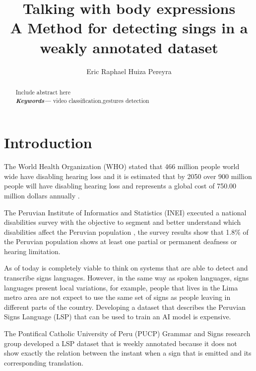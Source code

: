 \documentclass[twocolumn]{article}
\providecommand{\keywords}[1]
{
  \small	
  \textbf{\textit{Keywords---}} #1
}
\begin{document}
\author[1]{Eric Raphael Huiza Pereyra}

\title{%
	\vspace{-2.0cm}
	\textbf{Talking with body expressions} \\	
	\Large \textbf{A Method for detecting sings in a weakly annotated dataset}
}

\maketitle
    
\begin{abstract}
Include abstract here \\
\keywords{video classification,gestures detection}
\end{abstract}

\section{Introduction}\label{intro}

The World Health Organization (WHO) stated that 466 million people world wide have disabling hearing loss and it is estimated that by 2050 over 900 million people will have disabling hearing loss and represents a global cost of 750.00 million dollars annually \cite{deafness_and_hearing_loss_2019}. 

The Peruvian Institute of Informatics and Statistics (INEI) executed a national disabilities survey with the objective to segment and better understand which disabilities affect the Peruvian population \cite{disabilities_survey_2012}, the survey results show that 1.8\% of the Peruvian population shows at least one partial or permanent deafness or hearing limitation. 

As of today is completely viable to think on systems that are able to detect and transcribe signs languages. However, in the same way as spoken languages, signs languages present local variations, for example, people that lives in the Lima metro area are not expect to use the same set of signs as people leaving in different parts of the country. Developing a dataset that describes the Peruvian Signs Language (LSP) \cite{lsp_2015} that can be used to train an AI model is expensive. 

The Pontifical Catholic University of Peru (PUCP) Grammar and  Signs research group developed a LSP dataset \cite{lsp_dataset} that is weekly annotated because it does not show exactly the relation between the instant when a sign that is emitted and its corresponding translation.
\end{document}

